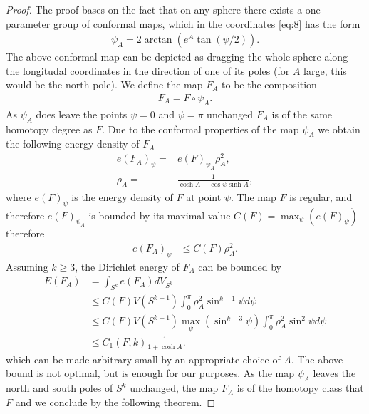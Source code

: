 \begin{proof}
  The proof bases on the fact that on any sphere there exists a one
  parameter group of conformal maps, which in the coordinates
  \eqref{eq:8} has the form
  \begin{align}
    \label{eq:11}
    \psi_A=2\arctan(e^A\tan(\psi/2)).
  \end{align}
  The above conformal map can be depicted as dragging the whole sphere
  along the longitudal coordinates in the direction of one of its
  poles (for $A$ large, this would be the north pole). We define the
  map $F_A$ to be the composition
  \begin{align}
    \label{eq:12}
    F_A=F\circ\psi_A.
  \end{align}
  As $\psi_A$ does leave the points $\psi=0$ and $\psi=\pi$ unchanged
  $F_A$ is of the same homotopy degree as $F$. Due to the conformal
  properties of the map $\psi_A$ we obtain the following energy
  density of $F_A$
  \begin{align}
    \label{eq:13}
    e(F_A)_\psi=&e(F)_{\psi_A}\rho_A^2,\\
    \rho_A=&\frac{1}{\cosh A-\cos\psi\sinh A},
  \end{align}
  where $e(F)_\psi$ is the energy density of $F$ at point $\psi$.  The
  map $F$ is regular, and therefore $e(F)_{\psi_A}$ is bounded by its
  maximal value $C(F)=\max_\psi\left(e(F)_\psi\right)$ therefore
  \begin{align}
    \label{eq:14}
    e(F_A)_\psi&\le C(F)\rho_A^2.
  \end{align}
  Assuming $k\ge3$, the Dirichlet energy of $F_A$ can be bounded by
  \begin{align}
    \label{eq:15}
    E(F_A)&=\int_{S^k}e(F_A)dV_{S^k}\\
    &\le C(F)V(S^{k-1})\int_{0}^{\pi}\rho_A^2\sin^{k-1}\psi d\psi\\
    &\le C(F)V(S^{k-1})\max_\psi(\sin^{k-3}\psi)\int_{0}^{\pi}\rho_A^2\sin^2\psi d\psi\\
    &\le C_1(F,k)\frac{1}{1+\cosh A}.
  \end{align}
  which can be made arbitrary small by an appropriate choice of $A$. The
  above bound is not optimal, but is enough for our purposes. As the map
  $\psi_A$ leaves the north and south poles of $S^k$ unchanged, the map
  $F_A$ is of the homotopy class that $F$ and we conclude by the
  following theorem.

\end{proof}



